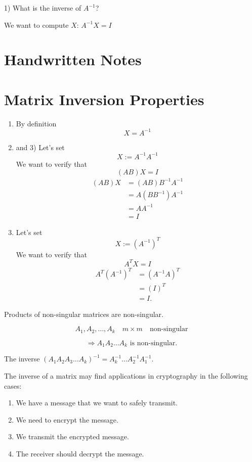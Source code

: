 \documentclass[a4paper, 12pt]{article}
\begin{document}
1) What is the inverse of $A^{-1}$?

We want to compute $X$: $A^{-1}X = I$
\section{Handwritten Notes}





\section*{Matrix Inversion Properties}

\begin{enumerate}
    \item By definition
    \[ X = A^{-1} \]
    
    \item and 3) Let's set
    \[ X := A^{-1}A^{-1} \]
    We want to verify that
    \[ (AB)X = I \]
    \begin{align*}
        (AB)X &= (AB)B^{-1}A^{-1} \\
        &= A(BB^{-1})A^{-1} \\
        &= AA^{-1} \\
        &= I
    \end{align*}
    
    \item Let's set
    \[ X := (A^{-1})^T \]
    We want to verify that
    \[ A^TX = I \]
    \begin{align*}
        A^T(A^{-1})^T &= (A^{-1}A)^T \\
        &= (I)^T \\
        &= I.
    \end{align*}
\end{enumerate}

Products of non-singular matrices are non-singular.

\[ A_1, A_2, \ldots, A_k \quad m \times m \quad \text{non-singular} \]

\[\Rightarrow A_1A_2 \ldots A_k \text{ is non-singular.} \]



The inverse $(A_1 A_2 A_3 \ldots A_k)^{-1} = A_k^{-1} \ldots A_2^{-1} A_1^{-1}$.

The inverse of a matrix may find applications in cryptography in the following cases:

\begin{enumerate}
    \item We have a message that we want to safely transmit.
    \item We need to encrypt the message.
    \item We transmit the encrypted message.
    \item The receiver should decrypt the message.
\end{enumerate}
\end{document}
